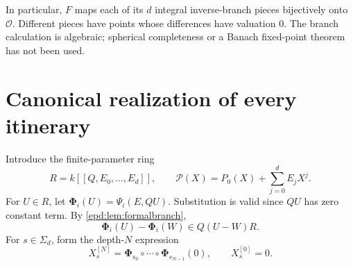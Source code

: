 \documentclass[11pt,a4paper]{article}
\numberwithin{equation}{section}
\theoremstyle{plain}
\theoremstyle{definition}
\theoremstyle{remark}
\newcommand{\OO}{\mathcal O}
\newcommand{\Sig}{\Sigma_d}
\begin{document}
In particular, $F$ maps each of its $d$ integral inverse-branch pieces
bijectively onto $\OO$. Different pieces have points whose differences
have valuation $0$. The branch calculation is algebraic; spherical
completeness or a Banach fixed-point theorem has not been used.

\section{Canonical realization of every itinerary}
\label{epd:sec:centers}
Introduce the finite-parameter ring
\[
 R=k[[Q,E_0,\ldots,E_d]],\qquad
 \mathcal P(X)=P_0(X)+\sum_{j=0}^dE_jX^j.
\]
For $U\in R$, let
$\boldsymbol\Phi_i(U)=\Psi_i(E,QU)$. Substitution is valid since $QU$
has zero constant term. By \cref{epd:lem:formalbranch},
\begin{equation}\label{epd:eq:q-contraction}
 \boldsymbol\Phi_i(U)-\boldsymbol\Phi_i(W)\in Q(U-W)R.
\end{equation}
For $s\in\Sig$, form the depth-$N$ expression
\[
 X_s^{[N]}=
 \boldsymbol\Phi_{s_0}\circ\cdots\circ
 \boldsymbol\Phi_{s_{N-1}}(0),
 \qquad X_s^{[0]}=0.
\]
\end{document}
